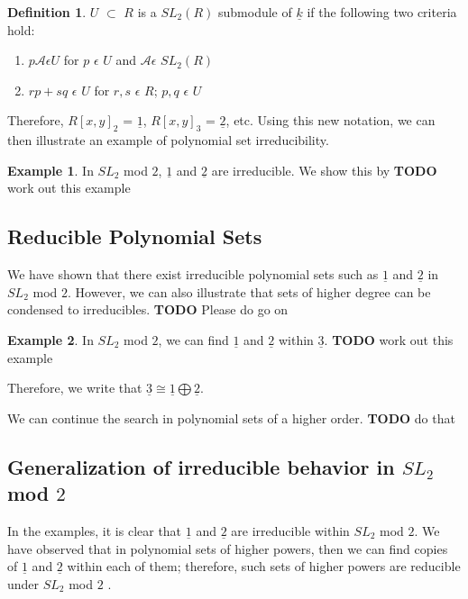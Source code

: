 \documentclass[a4paper,draft]{amsproc}
\theoremstyle{plain}
\theoremstyle{definition}
\newtheorem{exm}{Example}[section]
\newtheorem{dfn}{Definition}[section]
\theoremstyle{remark}
\numberwithin{equation}{section}
\begin{document}
\begin{dfn}
$U$ $\subset$ $R$ is a  $SL_{2}(R)$ submodule of $\underline{k}$ if the following two criteria hold: 

\begin{enumerate}
  \item $p  \mathcal{A} \epsilon U$ for $p$ $\epsilon$ $U$ and $\mathcal{A} \epsilon$ $SL_{2}(R)$ 
  \item $rp + sq$ $\epsilon$ $U$ for $r, s$ $\epsilon$ $R$; $p, q$ $\epsilon$ $U$
\end{enumerate}

\end{dfn}
Therefore, $R[x,y]_{2}$ = $\underline{1}$, $R[x,y]_{3}$ = $\underline{2}$, etc. Using this new notation, we can then illustrate an example of polynomial set irreducibility. 

\begin{exm}
In  $SL_{2}$ mod $2$, $\underline{1}$ and $\underline{2}$ are irreducible. We show this by
\textbf{TODO} work out this example
\end{exm}

\subsection{Reducible Polynomial Sets}
We have shown that there exist irreducible polynomial sets such as $\underline{1}$ and $\underline{2}$ in  $SL_{2}$ mod $2$. However, we can also illustrate that sets of higher degree can be condensed to irreducibles. 
\textbf{TODO} Please do go on
\begin{exm}
In  $SL_{2}$ mod $2$, we can find $\underline{1}$ and $\underline{2}$ within $\underline{3}$. 
\textbf{TODO} work out this example

Therefore, we write that $\underline{3} \cong \underline{1} \bigoplus \underline{2}$. 
\end{exm}

We can continue the search in polynomial sets of a higher order. 
\textbf{TODO} do that

\subsection{Generalization of irreducible behavior in $SL_{2}$ mod $2$ }
In the examples, it is clear that $\underline{1}$ and $\underline{2}$ are irreducible within $SL_{2}$ mod $2$. We have observed that in polynomial sets of higher powers, then we can find copies of $\underline{1}$ and $\underline{2}$ within each of them; therefore, such sets of higher powers are reducible under $SL_{2}$ mod $2$ . 
\end{document}
